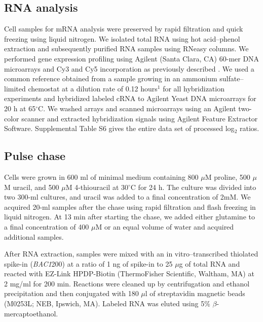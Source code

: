 \subsection{RNA analysis} 

Cell samples for
mRNA analysis were preserved by rapid filtration and quick freezing
using liquid nitrogen. We isolated total RNA using hot acid–phenol
extraction and subsequently purified RNA samples using RNeasy columns.
We performed gene expression profiling using Agilent (Santa Clara, CA)
60-mer DNA microarrays and Cy3 and Cy5 incorporation as previously
described 
\parencite{brauer2008coordination}. We used a common reference obtained
from a sample growing in an ammonium sulfate–limited chemostat at a
dilution rate of 0.12 hours$^1$ for all hybridization experiments and
hybridized labeled cRNA to Agilent Yeast DNA microarrays for 20 h at
65$^{\circ}$C. We washed arrays and scanned microarrays using an Agilent
two-color scanner and extracted hybridization signals using Agilent
Feature Extractor Software. Supplemental Table S6 gives the entire
data set of processed log$_2$ ratios.  

\subsection{Pulse chase} 

Cells were grown in
600 ml of minimal medium containing 800 $\mu$M proline, 500 $\mu$M uracil, and
500 $\mu$M 4-thiouracil at 30$^{\circ}$C for 24 h. The culture was divided into two
300-ml cultures, and uracil was added to a final concentration of 2mM. 
We acquired 20-ml samples after the chase using rapid filtration
and flash freezing in liquid nitrogen. At 13 min after starting the
chase, we added either glutamine to a final concentration of 400 $\mu$M or
an equal volume of water and acquired additional samples.  

After RNA
extraction, samples were mixed with an in vitro–transcribed thiolated
spike-in (\textit{BAC1}200) at a ratio of 1 ng of spike-in to 25 $\mu$g of total
RNA and reacted with EZ-Link HPDP-Biotin (ThermoFisher Scientific,
Waltham, MA) at 2 mg/ml for 200 min. Reactions were cleaned up by
centrifugation and ethanol precipitation and then conjugated with 180
$\mu$l of streptavidin magnetic beads (M0253L; NEB, Ipswich, MA). Labeled
RNA was eluted using 5\% $\beta$-mercaptoethanol.  


